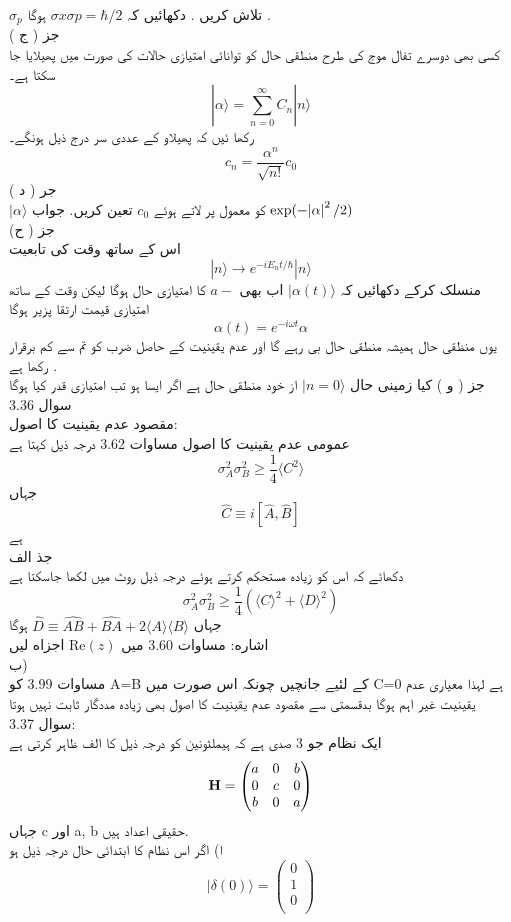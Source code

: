 \documentclass{book}
\begin{document}
\(\sigma_{p}\)
تلاش کریں . دکھائیں کہ
\(\sigma{x}\sigma{p}=\hbar/2\)
ہوگا .\\
جز ( ج )\\
کسی بھی دوسرے تفال موج کی طرح منطقی حال کو توانائی امتیازی حالات کی صورت میں پھیلایا جا سکتا ہے۔\\
\[|\alpha\rangle=\sum_{n=0}^{\infty}C_{n}|n\rangle\]
رکھا ئیں کہ پھیلاو کے عددی سر درج ذیل ہونگے۔\\
\[c_{n}=\frac{\alpha^{n}}{\sqrt{n!}}c_{0}\]
جر ( د )\\
\(|\alpha\rangle\)
کو معمول پر لاتے ہوئے
\(c_{0}\)
تعین کریں.
جواب
\(\text{exp}(-\abs{\alpha}^{2}/2)\)\\
جز ( ح)\\
اس کے ساتھ وقت کی تابعیت\\
\[|n\rangle\rightarrow e^{-iE_{n}t/\hbar}|n\rangle\]
منسلک کرکے دکھائیں کہ
\(|\alpha(t)\rangle\)
اب بھی
\(a{-}\)
کا امتیازی حال ہوگا لیکن وقت کے ساتھ امتیازی قیمت ارتقا پزیر ہوگا\\
\[\alpha(t)=e^{-i\omega t}\alpha\]
یوں منظقی حال ہمیشہ منطقی حال بی رہے گا اور عدم یقینیت کے حاصل ضرب کو تم سے کم برقرار رکھا ہے .\\
جز ( و ) کیا زمینی حال
\(|n=0\rangle\)
از خود منطقی حال ہے اگر ایسا ہو تب امتیازی قدر کیا ہوگا \\
سوال 
3.36\\
مقصود عدم یقینیت کا اصول:\\
عمومی عدم یقینيت کا اصول مساوات  3.62 درجہ ذيل کہتا ہے
\[\sigma_{A}^{2}\sigma_{B}^{2}\geq\frac{1}{4}\langle C^{2} \rangle\]
جہاں
\[\hat{C}\equiv i[\hat{A},\hat{B}]\]
ہے\\ 
جذ الف\\
دکھائے کہ اس کو زیادہ مستحكم کرتے ہوئے درجہ ذیل روٹ میں لکھا جاسکتا ہے
\[\sigma_{A}^{2}\sigma_{B}^{2}\geq\frac{1}{4}(\langle C\rangle^{2}+\langle D \rangle ^{2})\]
جہاں
\(\hat{D}\equiv \hat{AB}+\hat{BA}+2\langle A \rangle \langle B \rangle\)
ہوگا\\
اشاره: مساوات 3.60 میں 
\(\text{Re}(z)\)
 اجزاه لیں\\
ب)\\
مساوات 3.99 کو
 A=B
  کے لئیے جانچیں چونکہ اس صورت میں
 C=0
   ہے لہذا معیاری عدم یقینیت غیر اہم ہوگا بدقسمتی سے مقصود عدم یقینيت کا اصول بھی زیادہ مددگار ثابت نہیں ہوتا\\
سوال
 3.37:\\
ایک نظام جو 3 صدی ہے کہ ہیملٹونین کو درجہ ذيل کا الف ظاہر کرتی ہے
\[\text{\textbf{H}}=\begin{pmatrix}
a&0&b\\
0&c&0\\
b&0&a\\
\end{pmatrix}\]
جہاں c اور a, b حقیقی اعداد ہیں.\\
ا) اگر اس نظام کا ابتدائی حال درجہ ذيل ہو
\[|\delta(0) \rangle=\begin{pmatrix}
0\\
1\\
0\\
\end{pmatrix}\]
\end{document}
